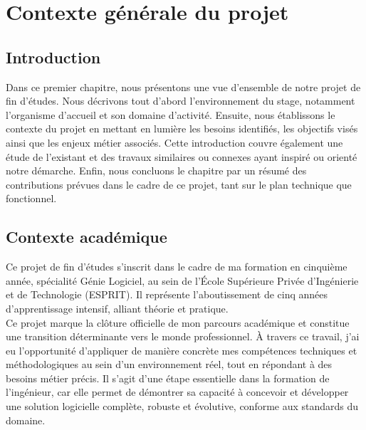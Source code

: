 \chapter{Contexte générale du projet }

\section*{Introduction}

Dans ce premier chapitre, nous présentons une vue d’ensemble de notre projet de fin d’études. Nous décrivons tout d’abord l’environnement du stage, notamment l’organisme d’accueil et son domaine d’activité. Ensuite, nous établissons le contexte du projet en mettant en lumière les besoins identifiés, les objectifs visés ainsi que les enjeux métier associés. Cette introduction couvre également une étude de l’existant et des travaux similaires ou connexes ayant inspiré ou orienté notre démarche. Enfin, nous concluons le chapitre par un résumé des contributions prévues dans le cadre de ce projet, tant sur le plan technique que fonctionnel. \\

\section {Contexte académique }

Ce projet de fin d’études s’inscrit dans le cadre de ma formation en cinquième année, spécialité Génie Logiciel, au sein de l’École Supérieure Privée d'Ingénierie et de Technologie (ESPRIT). Il représente l’aboutissement de cinq années d’apprentissage intensif, alliant théorie et pratique.\\

\noindent Ce projet marque la clôture officielle de mon parcours académique et constitue une transition déterminante vers le monde professionnel. À travers ce travail, j’ai eu l’opportunité d’appliquer de manière concrète mes compétences techniques et méthodologiques au sein d’un environnement réel, tout en répondant à des besoins métier précis. Il s’agit d’une étape essentielle dans la formation de l’ingénieur, car elle permet de démontrer sa capacité à concevoir et développer une solution logicielle complète, robuste et évolutive, conforme aux standards du domaine.\\


